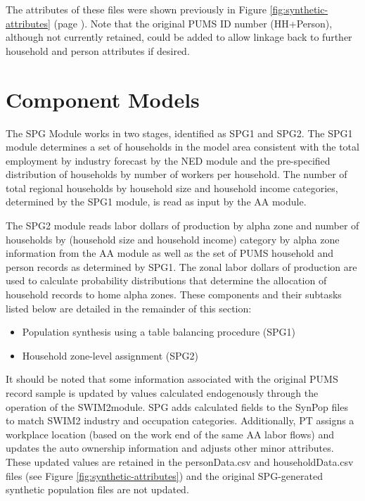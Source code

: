 \noindent The attributes of these files were shown previously in Figure \ref{fig:synthetic-attributes} (page \pageref{fig:synthetic-attributes}). Note that the original PUMS ID number (HH+Person), although not currently retained, could be added to allow linkage back to further household and person attributes if desired. 

\section{Component Models}

The SPG Module works in two stages, identified as SPG1 and SPG2. The SPG1 module determines a set of households in the model area consistent with the total employment by industry forecast by the NED module and the pre-specified distribution of households by number of workers per household. The number of total regional households by household size and household income categories, determined by the SPG1 module, is read as input by the AA module.

The SPG2 module reads labor dollars of production by alpha zone and number of households by (household size and household income) category by alpha zone information from the AA module as well as the set of PUMS household and person records as determined by SPG1. The zonal labor dollars of production are used to calculate probability distributions that determine the allocation of household records to home alpha zones. These components and their subtasks listed below are detailed in the remainder of this section:
\begin{itemize}
\item Population synthesis using a table balancing procedure (SPG1)
\item Household zone-level assignment (SPG2)
\end{itemize}

\noindent It should be noted that some information associated with the original PUMS record sample is updated by values calculated endogenously through the operation of the SWIM2module. SPG adds calculated fields to the SynPop files to match SWIM2 industry and occupation categories. Additionally, PT assigns a workplace location (based on the work end of the same AA labor flows) and updates the auto ownership information and adjusts other minor attributes. These updated values are retained in the personData.csv and householdData.csv files (see Figure \ref{fig:synthetic-attributes}) and the original SPG-generated synthetic population files are not updated. 

